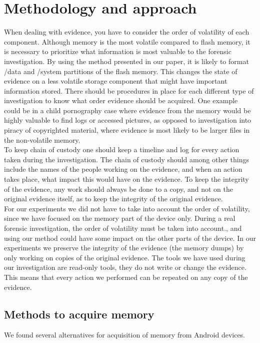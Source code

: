 \section{Methodology and approach}
When dealing with evidence, you have to consider the order of volatility of
each component. Although memory is the most volatile compared to flash memory,
it is necessary to prioritize what information is most valuable to the forensic
investigation. By using the method presented in our paper, it is likely to
format /data and /system partitions of the flash memory. This changes the state
of evidence on a less volatile storage component that might have important
information stored. There should be procedures in place for each different type
of investigation to know what order evidence should be acquired. One example
could be in a child pornography case where evidence from the memory would be
highly valuable to find logs or accessed pictures, as opposed to investigation
into piracy of copyrighted material, where evidence is most likely to be larger
files in the non-volatile memory.\\

To keep chain of custody one should keep a timeline and log for every action
taken during the investigation. The chain of custody should among other things
include the names of the people working on the evidence, and  when an action
takes place, what impact this would have on the evidence. To keep the integrity
of the evidence, any work should always be done to a copy, and not on the
original evidence itself, as to keep the integrity of the original evidence.\\

For our experiments we did not have to take into account the order of
volatility, since we have focused on the memory part of the device only. During
a real forensic investigation, the order of volatility must be taken into
account., and using our method could have some impact on the other parts of the
device. In our experiments we preserve the integrity of the evidence (the
memory dumps) by only working on copies of the original evidence. The tools we
have used during our investigation are read-only tools, they do not write or
change the evidence. This means that every action we performed can be repeated
on any copy of the evidence.

\subsection{Methods to acquire memory}
We found several alternatives for acquisition of memory from Android devices.
